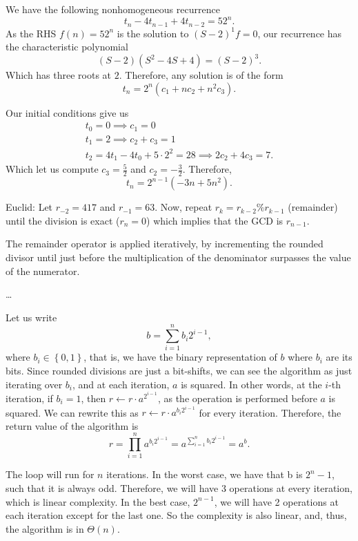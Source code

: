 We have the following nonhomogeneous recurrence \[
t_n - 4 t_{n-1} + 4 t_{n-2} = 5 2^{n}
.\] 
As the RHS $f(n) = 5 2^{n}$ is the solution to $(S-2)^{1} f = 0$, our recurrence has the characteristic polynomial \[
    (S-2)(S^2 - 4S +4) = (S-2)^3
.\] 
Which has three roots at $2$.
Therefore, any solution is of the form \[
    t_n = 2^{n} \left( c_1 + n c_2 + n^2 c_3 \right) 
.\] 

Our initial conditions give us
\begin{align*}
    t_0 = 0 \implies c_1 = 0 \\
    t_1 = 2 \implies c_2+c_3 = 1 \\
    t_2 = 4 t_1 - 4t_0 + 5 \cdot 2^{2} = 28 \implies 2c_2 + 4c_3 = 7 
.\end{align*}
Which let us compute $c_3=\frac{5}{2}$ and $c_2 = -\frac{3}{2}$.
Therefore, \[
t_n = 2^{n-1}\left( -3 n +5n^2 \right) 
.\] 


Euclid: Let $r_{-2} = 417$ and $r_{-1} = 63$. Now, repeat $r_{k}= r_{k-2} \% r_{k-1}$ (remainder) until the division is exact ($r_n = 0$) which implies that the GCD is  $r_{n-1}$.

The remainder operator is applied iteratively, by incrementing the rounded divisor until just before the multiplication of the denominator surpasses the value of the numerator.

\ldots



Let us write \[
b = \sum_{i=1}^{n} b_i 2^{i-1}
,\] 
where $b_i \in \left\{ 0,1 \right\} $, that is, we have the binary representation of $b$ where $b_i$ are its bits.
Since rounded divisions are just a bit-shifts, we can see the algorithm as just iterating over $b_i$, and at each iteration, $a$ is squared.
In other words, at the $i$-th iteration, if $b_i = 1$, then $r \gets r \cdot a^{2^{i-1}}$, as the operation is performed before $a$ is squared.
We can rewrite this as $r \gets r \cdot a^{b_i 2^{i-1}}$ for every iteration.
Therefore, the return value of the algorithm is \[
r = \prod_{i=1}^{n} a^{b_i 2^{i-1}} = a^{\sum_{i=1}^{n} b_i 2^{i-1}} = a^{b}
.\]


The loop will run for $n$ iterations. In the worst case, we have that b is $2^{n}-1$, such that it is always odd.
Therefore, we will have 3 operations at every iteration, which is linear complexity. In the best case, $2^{n-1}$, we will have 2 operations at each iteration except for the last one. So the complexity is also linear, and, thus, the algorithm is in $\Theta(n)$.


